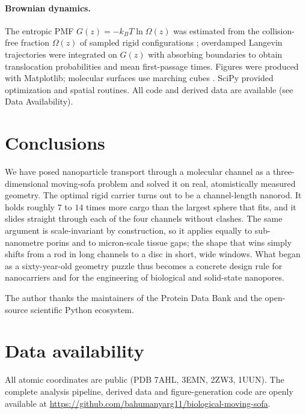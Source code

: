 \documentclass[aps,pre,twocolumn,superscriptaddress,floatfix,nofootinbib]{revtex4-2}
\begin{document}
\paragraph{Brownian dynamics.} The entropic PMF $G(z)=-k_BT\ln\Omega(z)$ was
estimated from the collision-free fraction $\Omega(z)$ of sampled rigid
configurations \cite{zwanzig1992}; overdamped Langevin trajectories were
integrated on $G(z)$ with absorbing boundaries to obtain translocation
probabilities and mean first-passage times. Figures were produced with
Matplotlib; molecular surfaces use marching cubes \cite{lorensen1987marching}.
SciPy \cite{virtanen2020scipy} provided optimization and spatial routines. All
code and derived data are available (see Data Availability).

\section{Conclusions}

We have posed nanoparticle transport through a molecular channel as a
three-dimensional moving-sofa problem and solved it on real, atomistically
measured geometry. The optimal rigid carrier turns out to be a channel-length
nanorod. It holds roughly $7$ to $14$ times more cargo than the largest sphere
that fits, and it slides straight through each of the four channels without
clashes. The same
argument is scale-invariant by construction, so it applies equally to
sub-nanometre porins and to micron-scale tissue gaps; the shape that wins simply
shifts from a rod in long channels to a disc in short, wide windows. What began
as a sixty-year-old geometry puzzle thus becomes a concrete design rule for
nanocarriers and for the engineering of biological and solid-state nanopores.

\begin{acknowledgments}
The author thanks the maintainers of the Protein Data Bank and the open-source
scientific Python ecosystem.
\end{acknowledgments}

\section*{Data availability}
All atomic coordinates are public (PDB 7AHL, 3EMN, 2ZW3, 1UUN). The complete
analysis pipeline, derived data and figure-generation code are openly available
at \url{https://github.com/bahumanyarg11/biological-moving-sofa}.
\end{document}
